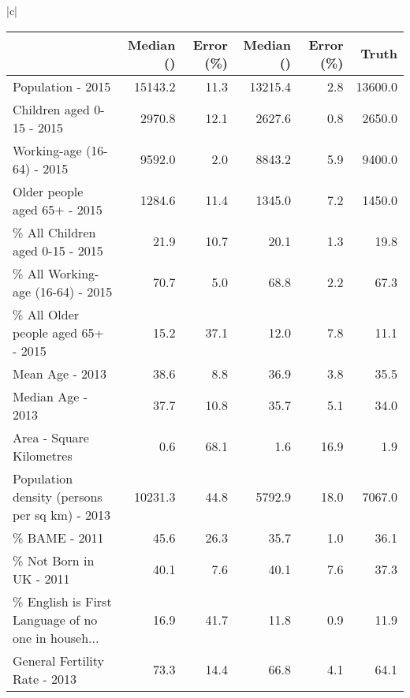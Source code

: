 \documentclass[conference]{IEEEtran}
\begin{document}
\begin{figure*}[ht!]
{\begin{tabular}{|c|}
\begin{table*}[t]
\centering
\footnotesize
\begin{tabular}{lrrrrr}
\hline
{} &  Median () &  Error (\%) &  Median () &  Error (\%) &   Truth \\
\hline
Population - 2015                                  &        15143.2 &       11.3 &        13215.4 &        2.8 & 13600.0 \\
Children aged 0-15 - 2015                          &         2970.8 &       12.1 &         2627.6 &        0.8 &  2650.0 \\
Working-age (16-64) - 2015                         &         9592.0 &        2.0 &         8843.2 &        5.9 &  9400.0 \\
Older people aged 65+ - 2015                       &         1284.6 &       11.4 &         1345.0 &        7.2 &  1450.0 \\
\% All Children aged 0-15 - 2015                    &           21.9 &       10.7 &           20.1 &        1.3 &    19.8 \\
\% All Working-age (16-64) - 2015                   &           70.7 &        5.0 &           68.8 &        2.2 &    67.3 \\
\% All Older people aged 65+ - 2015                 &           15.2 &       37.1 &           12.0 &        7.8 &    11.1 \\
Mean Age - 2013                                    &           38.6 &        8.8 &           36.9 &        3.8 &    35.5 \\
Median Age - 2013                                  &           37.7 &       10.8 &           35.7 &        5.1 &    34.0 \\
Area - Square Kilometres                           &            0.6 &       68.1 &            1.6 &       16.9 &     1.9 \\
Population density (persons per sq km) - 2013      &        10231.3 &       44.8 &         5792.9 &       18.0 &  7067.0 \\
\% BAME - 2011                                      &           45.6 &       26.3 &           35.7 &        1.0 &    36.1 \\
\% Not Born in UK - 2011                            &           40.1 &        7.6 &           40.1 &        7.6 &    37.3 \\
\% English is First Language of no one in househ... &           16.9 &       41.7 &           11.8 &        0.9 &    11.9 \\
General Fertility Rate - 2013                      &           73.3 &       14.4 &           66.8 &        4.1 &    64.1 \\

\end{tabular}
\end{table*}
\end{tabular}}
\end{figure*}
\end{document}
